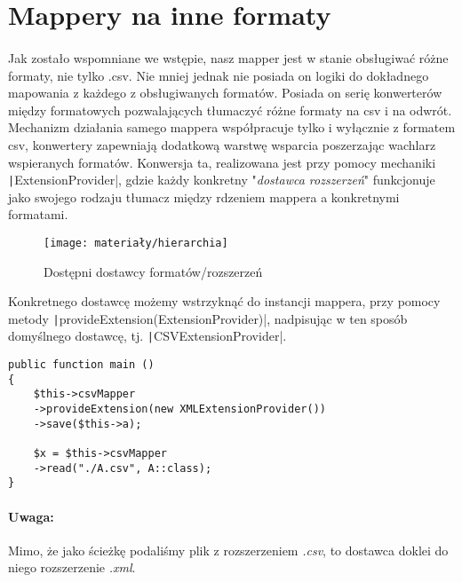\section{Mappery na inne formaty}
\paragraph{}Jak zostało wspomniane we wstępie, nasz mapper jest w stanie obsługiwać różne formaty, nie tylko .csv. Nie mniej jednak nie posiada on logiki do dokładnego mapowania z każdego z obsługiwanych formatów. Posiada on serię konwerterów między formatowych pozwalających tłumaczyć różne formaty na csv i na odwrót. Mechanizm działania samego mappera współpracuje tylko i wyłącznie z formatem csv, konwertery zapewniają dodatkową warstwę wsparcia poszerzając wachlarz wspieranych formatów. Konwersja ta, realizowana jest przy pomocy mechaniki \texttt|ExtensionProvider|, gdzie każdy konkretny "\textit{dostawca rozszerzeń}" funkcjonuje jako swojego rodzaju tłumacz między rdzeniem mappera a konkretnymi formatami.

\begin{figure}[ht]
	\centering
	\texttt{[image: materiały/hierarchia]}
	\caption{Dostępni dostawcy formatów/rozszerzeń}
\end{figure}

Konkretnego dostawcę możemy wstrzyknąć do instancji mappera, przy pomocy metody \texttt|provideExtension(ExtensionProvider)|, nadpisując w ten sposób domyślnego dostawcę, tj. \texttt|CSVExtensionProvider|.

\begin{empty}
	\begin{verbatim}
public function main ()
{
	$this->csvMapper
	->provideExtension(new XMLExtensionProvider())
	->save($this->a);
	
	$x = $this->csvMapper
	->read("./A.csv", A::class);
}
	\end{verbatim}
	\vspace{-10pt}
\end{empty}

\paragraph{Uwaga:} Mimo, że jako ścieżkę podaliśmy plik z rozszerzeniem \textit{.csv}, to dostawca doklei do niego rozszerzenie \textit{.xml}.

